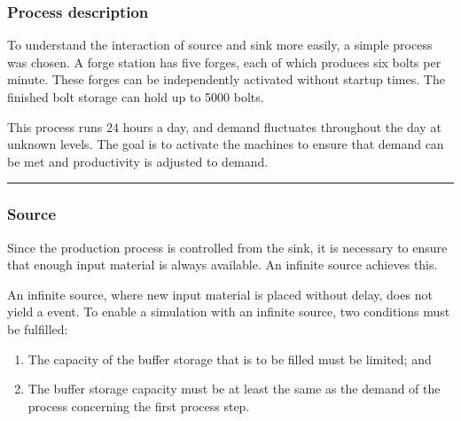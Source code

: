 \documentclass[letterpaper,10pt,english]{sphinxmanual}
\begin{document}
\subsubsection{Process description}
\label{\detokenize{source/Examples/example03:process-description}}\label{\detokenize{source/Examples/example03:process-description1}}
\sphinxAtStartPar
To understand the interaction of source and sink more easily, a simple process was chosen. A forge station has five
forges, each of which produces six bolts per minute. These forges can be independently activated without start\sphinxhyphen{}up times.
The finished bolt storage can hold up to 5000 bolts.


\sphinxAtStartPar
This process runs 24 hours a day, and demand fluctuates throughout the day at unknown levels. The goal is to activate
the machines to ensure that demand can be met and productivity is adjusted to demand.


\bigskip\hrule\bigskip



\subsubsection{Source}
\label{\detokenize{source/Examples/example03:source}}\label{\detokenize{source/Examples/example03:source1}}
\sphinxAtStartPar
Since the production process is controlled from the sink, it is necessary to ensure that enough input material is always
available. An infinite source achieves this.

\begin{sphinxVerbatim}[commandchars=\\\{\}]
  
     
\end{sphinxVerbatim}

\sphinxAtStartPar
An infinite source, where new input material is placed without delay, does not yield a  event. To enable a
simulation with an infinite source, two conditions must be fulfilled:
\begin{enumerate}
%
\item {} 
\sphinxAtStartPar
The capacity of the buffer storage that is to be filled must be limited; and

\item {} 
\sphinxAtStartPar
The buffer storage capacity must be at least the same as the demand of the process concerning the first process step.

\end{enumerate}
\end{document}
